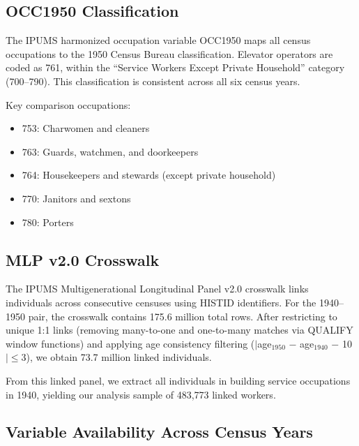 \documentclass[12pt]{article}
\begin{document}
\subsection{OCC1950 Classification}

The IPUMS harmonized occupation variable OCC1950 maps all census occupations to the 1950 Census Bureau classification. Elevator operators are coded as 761, within the ``Service Workers Except Private Household'' category (700--790). This classification is consistent across all six census years.

Key comparison occupations:
\begin{itemize}
    \item 753: Charwomen and cleaners
    \item 763: Guards, watchmen, and doorkeepers
    \item 764: Housekeepers and stewards (except private household)
    \item 770: Janitors and sextons
    \item 780: Porters
\end{itemize}

\subsection{MLP v2.0 Crosswalk}

The IPUMS Multigenerational Longitudinal Panel v2.0 crosswalk links individuals across consecutive censuses using HISTID identifiers. For the 1940--1950 pair, the crosswalk contains 175.6 million total rows. After restricting to unique 1:1 links (removing many-to-one and one-to-many matches via QUALIFY window functions) and applying age consistency filtering ($|$age$_{1950}$ $-$ age$_{1940}$ $-$ 10$| \leq 3$), we obtain 73.7 million linked individuals.

From this linked panel, we extract all individuals in building service occupations in 1940, yielding our analysis sample of 483,773 linked workers.

\subsection{Variable Availability Across Census Years}
\end{document}
